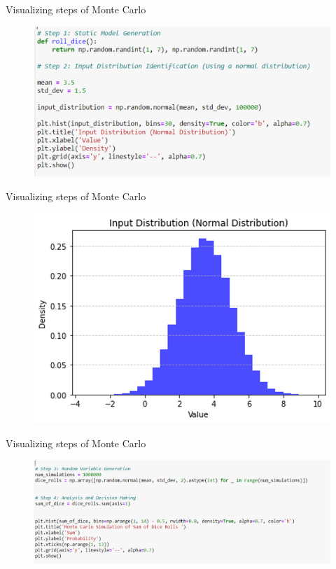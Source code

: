 \documentclass{beamer}
\begin{document}
    \begin{frame}{Visualizing steps of Monte Carlo}
        \begin{figure}
            \centering
            \includegraphics[width=\linewidth]{figures/code2.png}
        \end{figure}
    \end{frame}

    \begin{frame}{Visualizing steps of Monte Carlo}
        \begin{figure}
            \centering
            \includegraphics[width=0.8\linewidth]{figures/fig.png}
        \end{figure}
    \end{frame}

    \begin{frame}{Visualizing steps of Monte Carlo}
        \begin{figure}
            \centering
            \includegraphics[width=\textwidth]{figures/code3.png}
        \end{figure}
    \end{frame}
\end{document}
